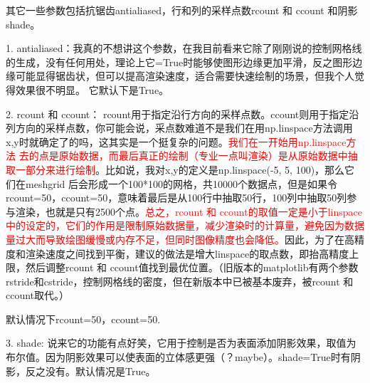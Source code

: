\documentclass[12pt]{article}
\begin{document}
其它一些参数包括抗锯齿antialiased，行和列的采样点数rcount  和  ccount 和阴影shade。

1. antialiased：我真的不想讲这个参数，在我目前看来它除了刚刚说的控制网格线的生成，没有任何用处，理论上它=True时能够使图形边缘更加平滑，反之图形边缘可能显得锯齿状，但可以提高渲染速度，适合需要快速绘制的场景，但我个人觉得效果很不明显。 它默认下是True。

2. rcount 和 ccount： rcount用于指定沿行方向的采样点数。ccount则用于指定沿列方向的采样点数，你可能会说，采点数难道不是我们在用np.linspace方法调用x,y时就确定了的吗，这其实是一个挺复杂的问题。\textcolor{red}{我们在一开始用np.linspace方法
去的点是原始数据，而最后真正的绘制（专业一点叫渲染）是从原始数据中抽取一部分来进行绘制}。比如说，我对x,y的定义是np.linspace(-5, 5, 100)，那么它们在meshgrid 后会形成一个100*100的网格，共10000个数据点，但是如果令rcount=50，ccount=50，意味着最后是从100行中抽取50行，100列中抽取50列参与渲染，也就是只有2500个点。\textcolor{red}{总之，rcount 和 ccount的取值一定是小于linspace中的设定的，它们的作用是限制原始数据量，减少渲染时的计算量，避免因为数据量过大而导致绘图缓慢或内存不足，但同时图像精度也会降低。}因此，为了在高精度和渲染速度之间找到平衡，建议的做法是增大linspace的取点数，即抬高精度上限，然后调整rcount 和 ccount值找到最优位置。（旧版本的matplotlib有两个参数rstride和cstride，控制网格线的密度，但在新版本中已被基本废弃，被rcount 和 ccount取代。）

默认情况下rcount=50，ccount=50.

3. shade: 说来它的功能有点好笑，它用于控制是否为表面添加阴影效果，取值为布尔值。因为阴影效果可以使表面的立体感更强（？maybe）。shade=True时有阴影，反之没有。默认情况是True。
\end{document}
